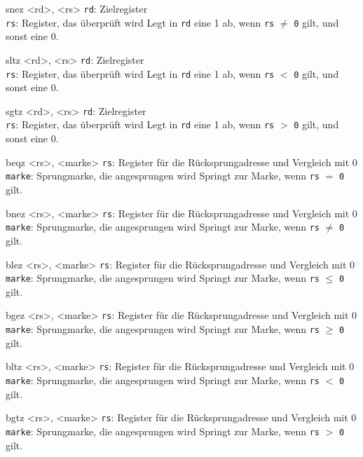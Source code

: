 \pseudoinst
{
  snez <rd>, <rs>
}
{
  \texttt{rd}: Zielregister \\
  \texttt{rs}: Register, das überprüft wird
}
{
  Legt in \texttt{rd} eine 1 ab, wenn \texttt{rs} $\neq$ \texttt{0} gilt, und
  sonst eine 0.
}

\pseudoinst
{
  sltz <rd>, <rs>
}
{
  \texttt{rd}: Zielregister \\
  \texttt{rs}: Register, das überprüft wird
}
{
  Legt in \texttt{rd} eine 1 ab, wenn \texttt{rs} $<$ \texttt{0} gilt, und
  sonst eine 0.
}

\pseudoinst
{
  sgtz <rd>, <rs>
}
{
  \texttt{rd}: Zielregister \\
  \texttt{rs}: Register, das überprüft wird
}
{
  Legt in \texttt{rd} eine 1 ab, wenn \texttt{rs} $>$ \texttt{0} gilt, und
  sonst eine 0.
}

\pseudoinst
{
  beqz <rs>, <marke>
}
{
  \texttt{rs}: Register für die Rücksprungadresse und Vergleich mit 0 \\
  \texttt{marke}: Sprungmarke, die angesprungen wird
}
{
  Springt zur Marke, wenn \texttt{rs} $=$ \texttt{0} gilt.
}

\pseudoinst
{
  bnez <rs>, <marke>
}
{
  \texttt{rs}: Register für die Rücksprungadresse und Vergleich mit 0 \\
  \texttt{marke}: Sprungmarke, die angesprungen wird
}
{
  Springt zur Marke, wenn \texttt{rs} $\neq$ \texttt{0} gilt.
}

\pseudoinst
{
  blez <rs>, <marke>
}
{
  \texttt{rs}: Register für die Rücksprungadresse und Vergleich mit 0 \\
  \texttt{marke}: Sprungmarke, die angesprungen wird
}
{
  Springt zur Marke, wenn \texttt{rs} $\leq$ \texttt{0} gilt.
}

\pseudoinst
{
  bgez <rs>, <marke>
}
{
  \texttt{rs}: Register für die Rücksprungadresse und Vergleich mit 0 \\
  \texttt{marke}: Sprungmarke, die angesprungen wird
}
{
  Springt zur Marke, wenn \texttt{rs} $\geq$ \texttt{0} gilt.
}

\pseudoinst
{
  bltz <rs>, <marke>
}
{
  \texttt{rs}: Register für die Rücksprungadresse und Vergleich mit 0 \\
  \texttt{marke}: Sprungmarke, die angesprungen wird
}
{
  Springt zur Marke, wenn \texttt{rs} $<$ \texttt{0} gilt.
}

\pseudoinst
{
  bgtz <rs>, <marke>
}
{
  \texttt{rs}: Register für die Rücksprungadresse und Vergleich mit 0 \\
  \texttt{marke}: Sprungmarke, die angesprungen wird
}
{
  Springt zur Marke, wenn \texttt{rs} $>$ \texttt{0} gilt.
}

